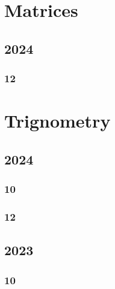 \documentclass[11pt]{book}
\begin{document}
\chapter{Matrices}
\section{2024}
\subsection{12}

%



\chapter{Trignometry}
\section{2024}
\subsection{10}


\subsection{12}

\section{2023}
\subsection{10}

%
\end{document}
